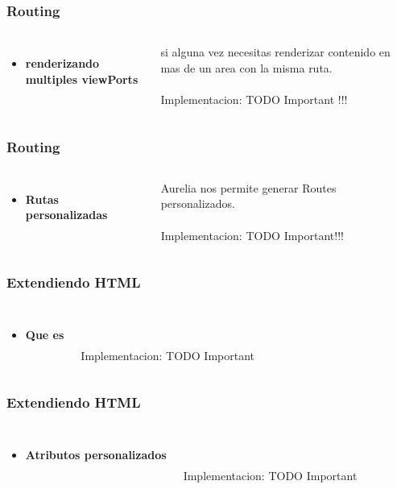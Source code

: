\documentclass{beamer}
\begin{document}
\begin{frame}
\frametitle{Routing}
\begin{columns}[c]
\begin{itemize}
\item \textbf{renderizando multiples viewPorts}
\end{itemize}
si alguna vez necesitas renderizar contenido en mas de un area con la misma ruta.
\\~\\
Implementacion: TODO Important !!!
\end{columns}
\end{frame}
\begin{frame}
\frametitle{Routing}
\begin{columns}[c]
\begin{itemize}
\item \textbf{Rutas personalizadas}
\end{itemize}

Aurelia nos permite generar Routes personalizados.
\\~\\
Implementacion: TODO Important!!!
\end{columns}
\end{frame}
\begin{frame}
\frametitle{Extendiendo HTML}
\begin{columns}[c]
\begin{itemize}
\item \textbf{Que es}
\end{itemize}


\\~\\
Implementacion: TODO Important
\end{columns}
\end{frame}
\begin{frame}
\frametitle{Extendiendo HTML}
\begin{columns}[c]
\begin{itemize}
\item \textbf{Atributos personalizados}
\end{itemize}

\\~\\
Implementacion: TODO Important
\end{columns}
\end{frame}
\end{document}
